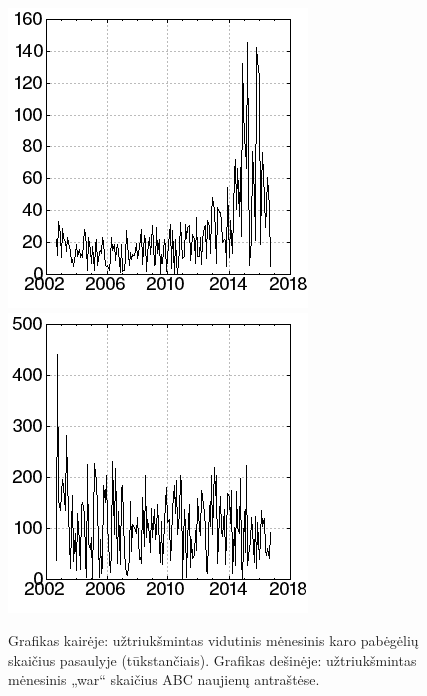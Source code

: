 \begin{figure}
    \includegraphics[scale=0.65]{../scripts/refugees_war_rand/refugees_rand.png}
    \includegraphics[scale=0.65]{../scripts/refugees_war_rand/war_rand.png}
    \caption{Grafikas kairėje: užtriukšmintas vidutinis mėnesinis karo pabėgėlių skaičius pasaulyje (tūkstančiais). Grafikas dešinėje: užtriukšmintas mėnesinis „war“ skaičius ABC naujienų antraštėse.}
    \label{fig:noisy}
\end{figure}

